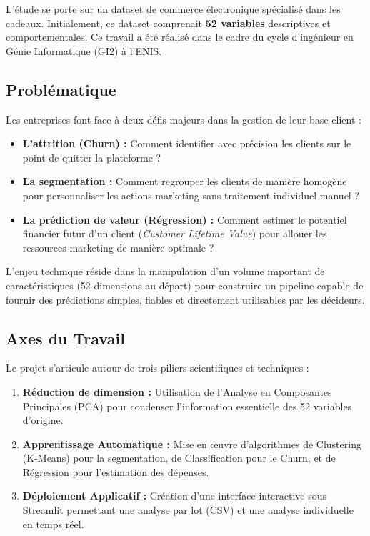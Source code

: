 \documentclass[11pt,a4paper]{article}
\begin{document}
L'étude se porte sur un dataset de commerce électronique spécialisé dans les cadeaux. Initialement, ce dataset comprenait \textbf{52 variables} descriptives et comportementales. Ce travail a été réalisé dans le cadre du cycle d'ingénieur en Génie Informatique (GI2) à l'ENIS.

\subsection{Problématique}
Les entreprises font face à deux défis majeurs dans la gestion de leur base client :
\begin{itemize}
    \item \textbf{L'attrition (Churn) :} Comment identifier avec précision les clients sur le point de quitter la plateforme ?
    \item \textbf{La segmentation :} Comment regrouper les clients de manière homogène pour personnaliser les actions marketing sans traitement individuel manuel ?
    \item \textbf{La prédiction de valeur (Régression) :} Comment estimer le potentiel financier futur d'un client (\textit{Customer Lifetime Value}) pour allouer les ressources marketing de manière optimale ?
\end{itemize}

L'enjeu technique réside dans la manipulation d'un volume important de caractéristiques (52 dimensions au départ) pour construire un pipeline capable de fournir des prédictions simples, fiables et directement utilisables par les décideurs.

\subsection{Axes du Travail}
Le projet s'articule autour de trois piliers scientifiques et techniques :
\begin{enumerate}
    \item \textbf{Réduction de dimension :} Utilisation de l'Analyse en Composantes Principales (PCA) pour condenser l'information essentielle des 52 variables d'origine.
    \item \textbf{Apprentissage Automatique :} Mise en œuvre d'algorithmes de Clustering (K-Means) pour la segmentation, de Classification pour le Churn, et de Régression pour l'estimation des dépenses.
    \item \textbf{Déploiement Applicatif :} Création d'une interface interactive sous Streamlit permettant une analyse par lot (CSV) et une analyse individuelle en temps réel.
\end{enumerate}
\end{document}
